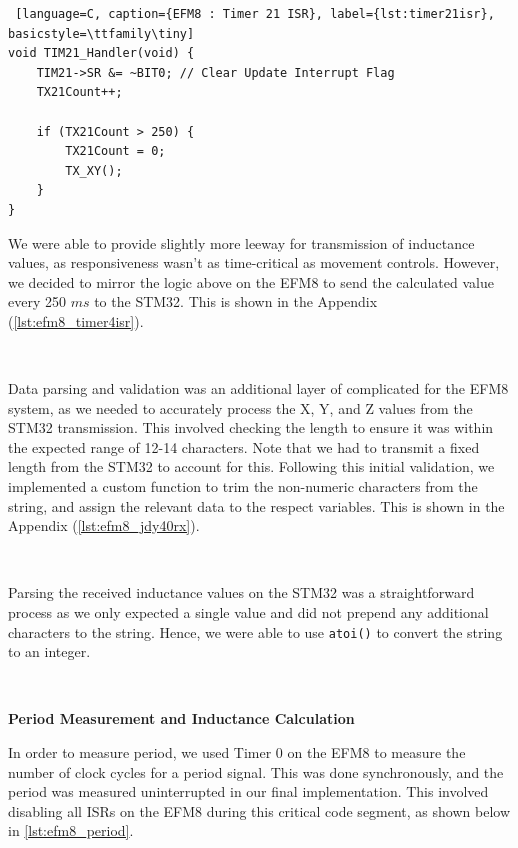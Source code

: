 \documentclass{article}
\begin{document}
\begin{lstlisting} [language=C, caption={EFM8 : Timer 21 ISR}, label={lst:timer21isr}, basicstyle=\ttfamily\tiny]
void TIM21_Handler(void) {
	TIM21->SR &= ~BIT0; // Clear Update Interrupt Flag
	TX21Count++;

	if (TX21Count > 250) {
		TX21Count = 0;
		TX_XY();
	}
}
\end{lstlisting}

We were able to provide slightly more leeway for transmission of inductance values, as responsiveness wasn't as time-critical as movement controls. However, we
decided to mirror the logic above on the EFM8 to send the calculated value every 250 $ms$ to the STM32. This is shown in the Appendix (\ref{lst:efm8_timer4isr}).

\

Data parsing and validation was an additional layer of complicated for the EFM8 system, as we needed to accurately process the X, Y, and Z values from
the STM32 transmission. This involved checking the length to ensure it was within the expected range of 12-14 characters. Note that we had to transmit a fixed length from the
STM32 to account for this. Following this initial validation, we implemented a custom function to trim the non-numeric characters from the string, and assign the relevant data
to the respect variables. This is shown in the Appendix (\ref{lst:efm8_jdy40rx}).

\

Parsing the received inductance values on the STM32 was a straightforward process as we only expected a single value and did not prepend any additional characters to the string.
Hence, we were able to use \texttt{atoi()} to convert the string to an integer.

\

\textbf{Period Measurement and Inductance Calculation}

In order to measure period, we used Timer 0 on the EFM8 to measure the number of clock cycles for a period signal.
This was done synchronously, and the period was measured uninterrupted in our final implementation. This involved disabling all ISRs on the EFM8
during this critical code segment, as shown below in \ref{lst:efm8_period}.
\end{document}
